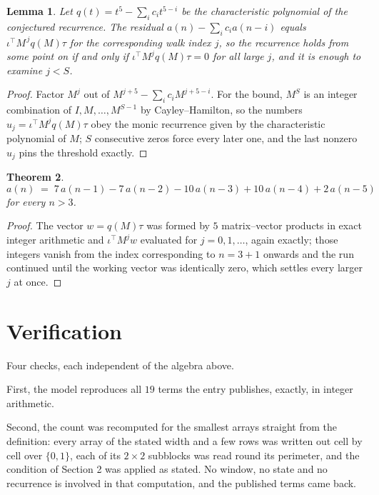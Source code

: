 \documentclass[11pt,a4paper]{article}
\theoremstyle{plain}
\newtheorem{theorem}{Theorem}
\newtheorem{lemma}[theorem]{Lemma}
\theoremstyle{definition}
\begin{document}
\begin{lemma}\label{lem:crit}
Let $q(t)=t^{5}-\sum_i c_it^{5-i}$ be the characteristic polynomial of the
conjectured recurrence. The residual $a(n)-\sum_ic_ia(n-i)$ equals
$\iota^{\!\top}M^{\,j}q(M)\tau$ for the corresponding walk index $j$, so the recurrence
holds from some point on if and only if $\iota^{\!\top}M^{j}q(M)\tau=0$ for all large $j$,
and it is enough to examine $j<S$.
\end{lemma}

\begin{proof}
Factor $M^{j}$ out of $M^{j+5}-\sum_ic_iM^{j+5-i}$. For the bound, $M^{S}$
is an integer combination of $I,M,\dots,M^{S-1}$ by Cayley--Hamilton, so the numbers
$u_j=\iota^{\!\top}M^{j}q(M)\tau$ obey the monic recurrence given by the characteristic
polynomial of $M$; $S$ consecutive zeros force every later one, and the last nonzero $u_j$
pins the threshold exactly.
\end{proof}

\begin{theorem}
\[
a(n)\;=\;7\,a(n-1) - 7\,a(n-2) - 10\,a(n-3) + 10\,a(n-4) + 2\,a(n-5)
\]
for every $n>3$.
\end{theorem}

\begin{proof}
The vector $w=q(M)\tau$ was formed by $5$ matrix--vector products in exact integer
arithmetic and $\iota^{\!\top}M^{j}w$ evaluated for $j=0,1,\dots$, again exactly; those
integers vanish from the index corresponding to $n=3+1$ onwards and the run continued
until the working vector was identically zero, which settles every larger $j$ at once.
\end{proof}

\section{Verification}

Four checks, each independent of the algebra above.

First, the model reproduces all $19$ terms the entry publishes, exactly, in integer
arithmetic.

Second, the count was recomputed for the smallest arrays straight from the definition: every
array of the stated width and a few rows was written out cell by cell over $\{0,1\}$, each of
its $2\times2$ subblocks was read round its perimeter, and the condition of Section 2 was
applied as stated. No window, no state and no recurrence is involved in that computation, and
the published terms came back.
\end{document}
